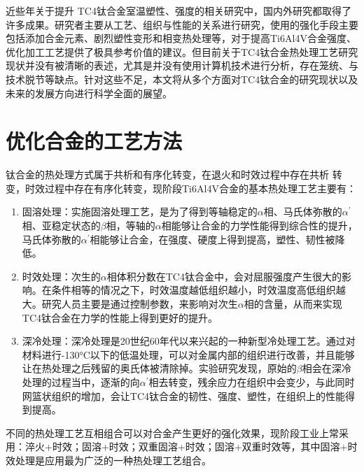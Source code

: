\documentclass[
class = book,
zihao = -4,
font = noto,
paper = a4paper,
openany
]{easybook}
\newcommand{\ti}{Ti6Al4V}
\begin{document}
近些年关于提升 TC4钛合金室温塑性、强度的相关研究中，国内外研究都取得了许多成果。研究者主要从工艺、组织与性能的关系进行研究，使用的强化手段主要包括添加合金元素、剧烈塑性变形和相变热处理等，对于提高\ti 合金强度、优化加工工艺提供了极具参考价值的建议。但目前关于TC4钛合金热处理工艺研究现状并没有被清晰的表述，尤其是并没有使用计算机技术进行分析，存在笼统、与技术脱节等缺点。针对这些不足，本文将从多个方面对TC4钛合金的研究现状以及未来的发展方向进行科学全面的展望。

\section{优化合金的工艺方法}
钛合金的热处理方式属于共析和有序化转变，在退火和时效过程中存在共析 转变，时效过程中存在有序化转变，现阶段\ti 合金的基本热处理工艺主要有：
\begin{enumerate}
	\item 固溶处理：实施固溶处理工艺，是为了得到等轴稳定的$\alpha $相、马氏体弥散的$ \alpha ^{\prime} $相、亚稳定状态的$\beta $相，等轴的$\alpha $相能够让合金的力学性能得到综合性的提升，马氏体弥散的$ \alpha ^{\prime} $相能够让合金，在强度、硬度上得到提高，塑性、韧性被降低\cite{gurong2002}。
	\item 时效处理：次生的$\alpha $相体积分数在TC4钛合金中，会对屈服强度产生很大的影响。在条件相等的情况之下，时效温度越低组织越小，时效温度高低组织越大。研究人员主要是通过控制参数，来影响对次生$\alpha $相的含量，从而来实现TC4钛合金在力学的性能上得到更好的提升。
	\item 深冷处理：深冷处理是20世纪60年代以来兴起的一种新型冷处理工艺。通过对材料进行-130°C以下的低温处理，可以对金属内部的组织进行改善，并且能够让在热处理之后残留的奥氏体被清除掉。实验研究发现，原始的$\beta $相会在深冷处理的过程当中，逐渐的向$\alpha^{\prime} $相去转变，残余应力在组织中会变少，与此同时网篮状组织的增加，会让TC4钛合金的韧性、强度、塑性，在组织上的性能得到提高。
\end{enumerate}
不同的热处理工艺互相组合可以对合金产生更好的强化效果，现阶段工业上常采用\cite{zhoukaixiangJiyushenlengchulidenanjiagongcailiaoqiexiaotexingyanjiu2022}：淬火+时效；固溶+时效；双重固溶+时效；固溶+双重时效等，其中固溶+时效处理是应用最为广泛的一种热处理工艺组合。
\end{document}
